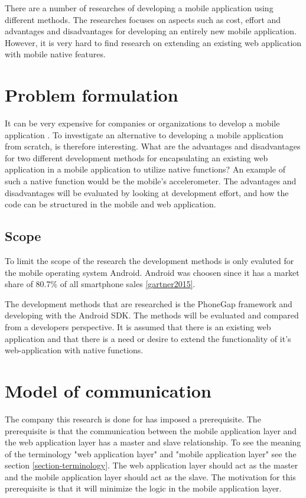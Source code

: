 There are a number of researches of developing a mobile application using different methods. The researches focuses on aspects such as cost, effort and advantages and disadvantages for developing an entirely new mobile application. However, it is very hard to find research on extending an existing web application with mobile native features. 

\section{Problem formulation}\label{section-problem-formulation}
It can be very expensive for companies or organizations to develop a mobile application \cite{kohan2015}. To investigate an alternative to developing a mobile application from scratch, is therefore interesting.
What are the advantages and disadvantages for two different development methods for encapsulating an existing web application in a mobile application to utilize native functions? An example of such a native function would be the mobile's accelerometer. The advantages and disadvantages will be evaluated by looking at development effort, and how the code can be structured in the mobile and web application. 

\subsection{Scope} \label{subsection-scope}
To limit the scope of the research the development methods is only evaluted for the mobile operating system Android. Android was choosen since it has a market share of 80.7\% of all smartphone sales \ref{gartner2015}.

The development methods that are researched is the PhoneGap framework and developing with the Android SDK. The methods will be evaluated and compared from a developers perspective. It is assumed that there is an existing web application and that there is a need or desire to extend the functionality of it's web-application with native functions.

\section{Model of communication}
The company this research is done for has imposed a prerequisite. The prerequisite is that the communication between the mobile application layer and the web application layer has a master and slave relationship. To see the meaning of the terminology "web application layer" and "mobile application layer" see the section \ref{section-terminology}. The web application layer should act as the master and the mobile application layer should act as the slave. The motivation for this prerequisite is that it will minimize the logic in the mobile application layer. 

